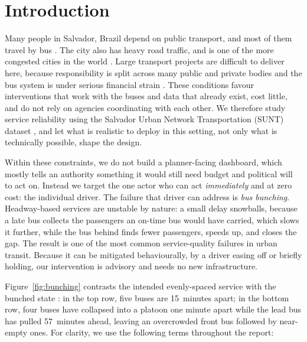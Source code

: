 \documentclass[final,5p,times,twocolumn,authoryear]{elsarticle}
\begin{document}
\section{Introduction}
\label{sec:intro}

Many people in Salvador, Brazil depend on public transport, and most of them travel by bus
\citep{bndes2025salvador, Ferreira2025}. The city also has heavy road traffic, and is one of the more
congested cities in the world \citep{tomtom2025salvador, tomtom2025ranking}. Large transport projects
are difficult to deliver here, because responsibility is split across many public and private bodies
and the bus system is under serious financial strain \citep{tcebahia2022compensacao,
worldbank2026salvador}. These conditions favour interventions that work with the buses and data that
already exist, cost little, and do not rely on agencies coordinating with each other. We therefore
study service reliability using the Salvador Urban Network Transportation (SUNT) dataset
\citep{Ferreira2025}, and let what is realistic to deploy in this setting, not only what is
technically possible, shape the design.

Within these constraints, we do not build a planner-facing dashboard, which mostly tells an
authority something it would still need budget and political will to act on. Instead we target the
one actor who can act \emph{immediately} and at zero cost: the individual driver. The failure that
driver can address is \emph{bus bunching}. Headway-based services are unstable by nature: a small
delay snowballs, because a late bus collects the passengers an on-time bus would have carried, which
slows it further, while the bus behind finds fewer passengers, speeds up, and closes the gap. The
result is one of the most common service-quality failures in urban transit. Because it can be
mitigated behaviourally, by a driver easing off or briefly holding, our intervention is advisory and
needs no new infrastructure.

Figure~\ref{fig:bunching} contrasts the intended evenly-spaced service with the bunched
state \citep{Enayatollahi2019}: in the top row, five buses are 15~minutes apart; in the
bottom row, four buses have collapsed into a platoon one minute apart while the lead bus
has pulled 57~minutes ahead, leaving an overcrowded front bus followed by near-empty ones.
For clarity, we use the following terms throughout the report:
\end{document}
